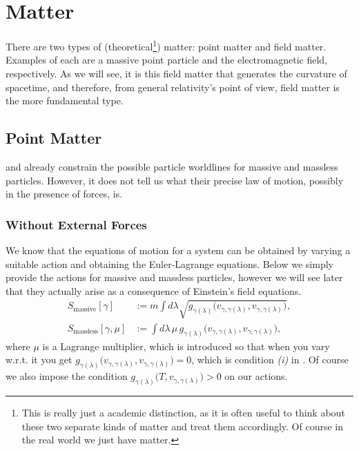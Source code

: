 \chapter{Matter}

There are two types of (theoretical\footnote{This is really just a academic distinction, as it is often useful to think about these two separate kinds of matter and treat them accordingly. Of course in the real world we just have matter.}) matter: point matter and field matter. Examples of each are a massive point particle and the electromagnetic field, respectively. As we will see, it is this field matter that generates the curvature of spacetime, and therefore, from general relativity's point of view, field matter is the more fundamental type. 

\section{Point Matter}

 and  already constrain the possible particle worldlines for massive and massless particles. However, it does not tell us what their precise law of motion, possibly in the presence of forces, is.  

\subsection{Without External Forces}

We know that the equations of motion for a system can be obtained by varying a suitable action and obtaining the Euler-Lagrange equations. Below we simply provide the actions for massive and massless particles, however we will see later that they actually arise as a consequence of Einstein's field equations. 
\begin{equation*}
    \begin{split}
        S_{\text{massive}}[\gamma] & := m\int d\lambda \sqrt{g_{\gamma(\lambda)}\big(v_{\gamma,\gamma(\lambda)},v_{\gamma,\gamma(\lambda)}\big)}, \\
        S_{\text{massless}}[\gamma,\mu] & := \int d\lambda \, \mu \, g_{\gamma(\lambda)}\big(v_{\gamma,\gamma(\lambda)},v_{\gamma,\gamma(\lambda)}\big),
    \end{split}
\end{equation*}
where $\mu$ is a Lagrange multiplier, which is introduced so that when you vary w.r.t. it you get $g_{\gamma(\lambda)}\big(v_{\gamma,\gamma(\lambda)},v_{\gamma,\gamma(\lambda)}\big) =0$, which is condition \textit{(i)} in . Of course we also impose the condition $g_{\gamma(\lambda)}\big(T,v_{\gamma,\gamma(\lambda)}\big) >0$ on our actions. 

